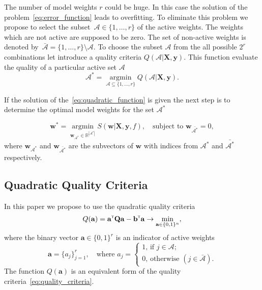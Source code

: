 \documentclass[a4paper,12pt]{article}
\theoremstyle{plain} %
\theoremstyle{definition} %
\theoremstyle{remark} %
\newcommand{\ba}{\mathbf{a}}
\newcommand{\bb}{\mathbf{b}}
\newcommand{\bw}{\mathbf{w}}
\newcommand{\bQ}{\mathbf{Q}}
\newcommand{\by}{\mathbf{y}}
\newcommand{\bX}{\mathbf{X}}
\newcommand{\cA}{\mathcal{A}}
\newcommand{\bbR}{\mathbb{R}}
\newcommand{\T}{{\text{\tiny\sffamily\upshape\mdseries T}}}
\newcommand{\argmin}{\mathop{\arg \min}\limits}
\begin{document}
	The number of model weights $r$ could be huge. 
	In this case the solution of the problem~\ref{eq:error_function} leads to overfitting. 
	To eliminate this problem we propose to select the subset~$\cA \in \{1, \dots, r\}$ of the active weights. 
	The weights which are not active are supposed to be zero.
	The set of non-active weights is denoted by~$\bar{\cA} = \{1, \dots, r\} \setminus \cA$.
	To choose the subset $\cA$ from the all possible $2^r$ combinations let introduce a quality criteria $Q(\cA | \bX, \by)$. This function evaluate the quality of a particular active set $\cA$
	\begin{equation}
		\cA^* = \argmin_{\cA \subseteq \{1, \dots, r\}} Q(\cA | \bX, \by).
		\label{eq:quality_criteria}
	\end{equation}
	
	If the solution of the~\ref{eq:quadratic_function} is given the next step is to determine the optimal model weights	for the set $\cA^*$
	
	\begin{equation}
		\bw^* = \argmin_{\bw_{\cA^*} \in \bbR^{|\cA^*|}} S(\bw | \bX, \by, f), \quad \text{subject to } \bw_{\bar{\cA^*}} = 0,
		\label{eq:reduced_error_function}
	\end{equation}
	where $\bw_{\cA^*}$ and $\bw_{\bar{\cA^*}}$ are the subvectors of $\bw$ with indices from $\cA^*$ and $\bar{\cA^*}$ respectively.
	
	\subsection{Quadratic Quality Criteria}
	
	In this paper we propose to use the quadratic quality criteria
	\begin{equation}
	Q(\ba) = \ba^{\T} \bQ \ba - \bb^{\T} \ba \rightarrow \min_{\ba \in \{0,1\}^n},
	\label{eq:quadratic_function}
	\end{equation}
	where the binary vector $\ba \in \{0, 1\}^r$ is an indicator of active weights
	\begin{equation}
	\ba = \{a_j\}_{j=1}^r, \quad \text{where }
	a_j = 
	\begin{cases}
	1, \, \text{if } j \in \cA; \\
	0, \, \text{otherwise } (j \in \bar{\cA}).
	\end{cases}
	\end{equation}
	The function $Q(\ba)$ is an equivalent form of the quality criteria~\ref{eq:quality_criteria}.
	
\end{document}
